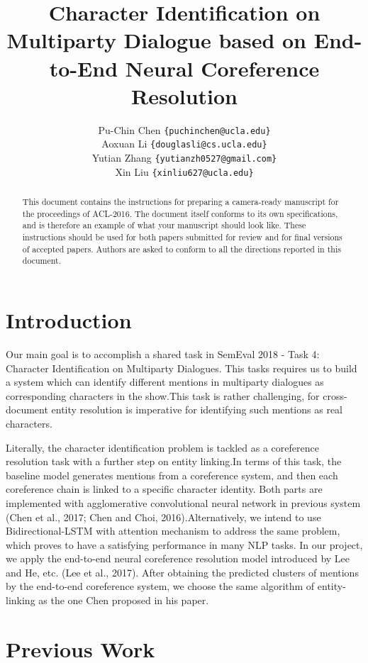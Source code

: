 \documentclass[11pt]{article}
\title{Character Identification on Multiparty Dialogue based on End-to-End Neural Coreference Resolution}
\author
{
   Pu-Chin Chen
  {\tt \{puchinchen@ucla.edu\}} \\
  Aoxuan Li 
  {\tt \{douglasli@cs.ucla.edu\}} \\
  Yutian Zhang
  {\tt \{yutianzh0527@gmail.com\}} \\
  Xin Liu
  {\tt \{xinliu627@ucla.edu\}} \\
}
\date{}
\begin{document}
\maketitle
\begin{abstract}
  This document contains the instructions for preparing a camera-ready
  manuscript for the proceedings of ACL-2016. The document itself
  conforms to its own specifications, and is therefore an example of
  what your manuscript should look like. These instructions should be
  used for both papers submitted for review and for final versions of
  accepted papers.  Authors are asked to conform to all the directions
  reported in this document.
\end{abstract}

\section{Introduction}

Our main goal is to accomplish a shared task in SemEval 2018 - Task 4: Character Identification on Multiparty Dialogues. This tasks requires us to build a system which can identify different mentions in multiparty dialogues as corresponding characters in the show.This task is rather challenging, for cross-document entity resolution is imperative for identifying such mentions as real characters.

Literally, the character identification problem is tackled as a coreference resolution task with a further step on entity linking.In terms of this task, the baseline model generates mentions from a coreference system, and then each coreference chain is linked to a specific character identity. Both parts are implemented with agglomerative convolutional neural network in previous system (Chen et al., 2017; Chen and Choi, 2016).Alternatively, we intend to use Bidirectional-LSTM with attention mechanism to address the same problem, which proves to have a satisfying performance in many NLP tasks. In our project, we apply the end-to-end neural coreference resolution model introduced by Lee and He, etc. (Lee et al., 2017). After obtaining the predicted clusters of mentions by the end-to-end coreference system, we choose the same algorithm of entity-linking as the one Chen proposed in his paper.

\section{Previous Work}
\end{document}
